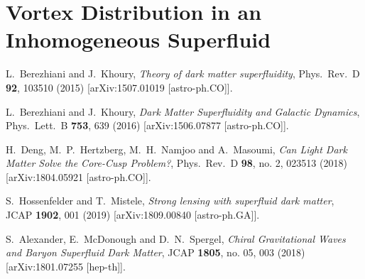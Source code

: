\documentclass[aps,prd,twocolumn,nofootinbib,superscriptaddress]{revtex4-1}
\begin{document}
\section{Vortex Distribution in an Inhomogeneous Superfluid}
\label{Sec:Distribution}








\begin{thebibliography}{99}


  L.~Berezhiani and J.~Khoury,
  \emph{Theory of dark matter superfluidity},
  Phys.\ Rev.\ D {\bf 92}, 103510 (2015)
  [arXiv:1507.01019 [astro-ph.CO]].
  
  L.~Berezhiani and J.~Khoury,
  \emph{Dark Matter Superfluidity and Galactic Dynamics},
  Phys.\ Lett.\ B {\bf 753}, 639 (2016)
  [arXiv:1506.07877 [astro-ph.CO]].


  H.~Deng, M.~P.~Hertzberg, M.~H.~Namjoo and A.~Masoumi,
  \emph{Can Light Dark Matter Solve the Core-Cusp Problem?},
  Phys.\ Rev.\ D {\bf 98}, no. 2, 023513 (2018)
  [arXiv:1804.05921 [astro-ph.CO]].

  S.~Hossenfelder and T.~Mistele,
  \emph{Strong lensing with superfluid dark matter},
  JCAP {\bf 1902}, 001 (2019)
  [arXiv:1809.00840 [astro-ph.GA]].

  S.~Alexander, E.~McDonough and D.~N.~Spergel,
  \emph{Chiral Gravitational Waves and Baryon Superfluid Dark Matter},
  JCAP {\bf 1805}, no. 05, 003 (2018)
  [arXiv:1801.07255 [hep-th]].


\end{thebibliography}
\end{document}
